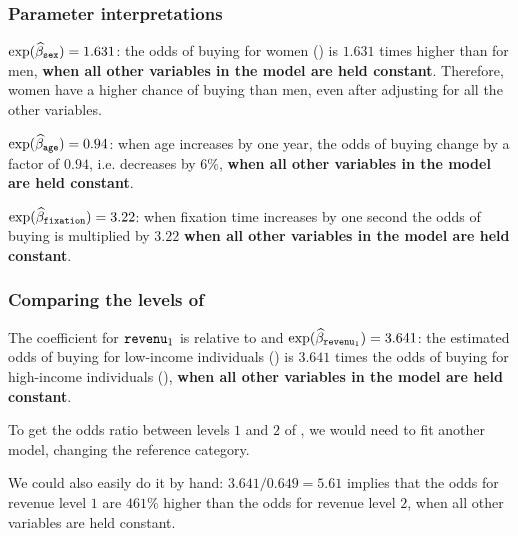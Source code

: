 \documentclass{beamer}
\begin{document}
\begin{frame}[fragile]
\frametitle{Parameter interpretations}
\bi
\item $\exp(\widehat{\beta}_{\texttt{sex}})=1.631$: the odds of buying for women () is $1.631$ times higher than for men, \textbf{when all other variables in the model are held constant}. Therefore, women have a higher chance of buying than men, even after adjusting for all the other variables. 
\item $\exp(\widehat{\beta}_{\texttt{age}})=0.94$: when age increases by one year, the odds of buying change by a factor of $0.94$, i.e. decreases by $6\%$, \textbf{when all other variables in the model are held constant}. 
\item $\exp(\widehat{\beta}_{\texttt{fixation}})=3.22$: when fixation time increases by one second the odds of buying is multiplied by $3.22$  \textbf{when all other variables in the model are held constant}.  

\ei
\end{frame}
\begin{frame}[fragile]
\frametitle{Comparing the levels of }
\bi
\item The coefficient for $\texttt{revenu}_1$ is relative to  and $\exp(\widehat{\beta}_{\texttt{revenu}_1})=3.641$:  the estimated odds of buying for low-income individuals () is $3.641$ times the odds of buying for high-income individuals (), \textbf{when all other variables in the model are held constant}. 
\item To get the odds ratio between levels $1$ and $2$ of , we would need to fit another model, changing the reference category.
\item We could also easily do it by hand: $3.641/0.649=5.61$ implies that the odds for revenue level $1$ are $461\%$ higher than the odds for revenue level $2$, when all other variables are held constant.
\ei
\end{frame}

% 
% 
\end{document}

